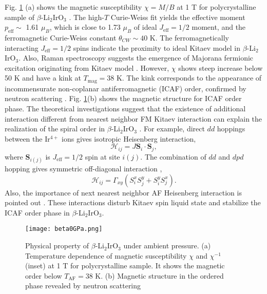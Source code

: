 \documentclass[a4,10.5pt]{report}
\begin{document}
Fig. \ref{beta0GPa} (a) shows the magnetic susceptibility $\chi = M/B$ at 1 T for polycrystalline sample of $\beta$-Li$_2$IrO$_3$ \cite{takayama2015hyperhoneycomb}.
The high-$T$ Curie-Weiss fit yields the effective moment $p_{\mathrm{eff}} \sim$ 1.61 $\mu_B$, which is close to 1.73 $\mu_B$ of ideal $J_{\mathrm{eff}} = 1/2$ moment,  
and the ferromagnetic Curie-Weiss constant $\theta_{CW} \sim 40$ K.
The ferromagnetically interacting $J_{\mathrm{eff}} = 1/2$ spins indicate the proximity to ideal Kitaev model in $\beta$-Li$_2$IrO$_3$.
Also, Raman spectroscopy suggests the emergence of Majorana fermionic excitation originating from Kitaev model \cite{glamazda2016raman}.
However, $\chi$ shows steep increase below 50 K and have a kink at $T_\mathrm{mag} = 38$ K.
The kink corresponds to the appearance of incommensurate non-coplanar antiferromagnetic (ICAF) order, confirmed by neutron scattering \cite{Biffin2014}. 
Fig. \ref{beta0GPa}(b) shows the magnetic structure for ICAF order phase.
The theoretical investigations suggest that the existence of additional interaction different from nearest neighbor FM Kitaev interaction 
can explain the realization of the spiral order in $\beta$-Li$_2$IrO$_3$ \cite{Lee2015}.
For example, direct $dd$ hoppings between the Ir$^{4+}$ ions gives isotropic Heisenberg interaction,
\begin{equation}
\mathcal{H}_{ij} = J\bm{S}_i\cdot\bm{S}_j,
\end{equation}
where $\bm{S}_{i(j)}$ is  $J_{\mathrm{eff}} = 1/2$ spin at site $i(j)$.
The combination of $dd$ and $dpd$ hopping gives symmetric off-diagonal interaction \cite{Nasu2014},
\begin{equation}
\mathcal{H}_{ij} = \Gamma_{xy} (S^x_iS^y_j + S^y_iS^x_j).
\label{symoff}
\end{equation}
Also, the importance of next nearest neighbor AF Heisenberg interaction is pointed out \cite{Katukuri2016}.
These interactions disturb Kitaev spin liquid state and stabilize the ICAF order phase in $\beta$-Li$_2$IrO$_3$.

\begin{figure}
  \centering
  \texttt{[image: beta0GPa.png]}
  \caption{Physical property of $\beta$-Li$_2$IrO$_3$ under ambient pressure.
  (a) Temperature dependence of magnetic susceptibility $\chi$ and $\chi^{-1}$ (inset) at 1 T for polycrystalline sample\cite{takayama2015hyperhoneycomb}.
  It shows the magnetic order below $T_{\mathrm{AF}} = 38$ K.
  (b) Magnetic structure in the ordered phase revealed by neutron scattering \cite{Biffin2014}}
  \label{beta0GPa}
\end{figure}
\end{document}
